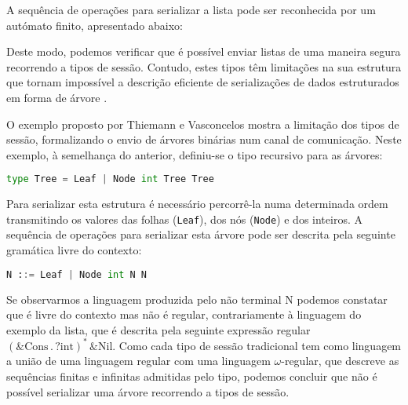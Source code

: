 A sequência de operações para serializar a lista pode ser reconhecida por um autómato finito, apresentado abaixo:



Deste modo, podemos verificar que é possível enviar listas de uma maneira segura recorrendo a tipos de sessão. Contudo, estes tipos têm limitações na sua estrutura que tornam impossível a descrição eficiente de serializações de dados estruturados em forma de árvore \cite{Thiemann-Vasconcelos:2016:CFST}.

O exemplo proposto por Thiemann e Vasconcelos
mostra a limitação dos tipos de sessão, formalizando o envio de árvores binárias num canal de comunicação. Neste exemplo, à semelhança do anterior, definiu-se o tipo recursivo para as árvores:
\begin{lstlisting}[language=Python]
	type Tree = Leaf | Node int Tree Tree
\end{lstlisting}
Para serializar esta estrutura é necessário percorrê-la numa determinada ordem transmitindo os valores das folhas (\lstinline"Leaf"), dos nós (\lstinline"Node") e dos inteiros. A sequência de operações para serializar esta árvore pode ser descrita pela seguinte gramática livre do contexto:
\begin{lstlisting}[language=Python]
	N ::= Leaf | Node int N N
\end{lstlisting}
Se observarmos a linguagem produzida pelo não terminal N podemos constatar que é livre do contexto mas não é regular, contrariamente à linguagem do exemplo da lista, que é descrita pela seguinte expressão regular $(\&\mbox{Cons}\,.\,?\mbox{int})^{*}\,\&\mbox{Nil}$. Como cada tipo de sessão tradicional tem como linguagem a união de uma linguagem regular com uma linguagem $\omega$-regular, que descreve as sequências finitas e infinitas admitidas pelo tipo, podemos concluir que não é possível serializar uma árvore recorrendo a tipos de sessão.

